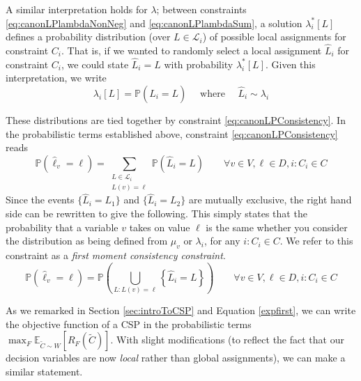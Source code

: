 A similar interpretation holds for $\lambda$; between constraints \ref{eq:canonLPlambdaNonNeg} and \ref{eq:canonLPlambdaSum}, a solution $\lambda^*_i[L]$ defines a probability distribution (over $L \in \mathcal{L}_i$) of possible local assignments for constraint $C_i$. That is, if we wanted to randomly select a local  assignment $\hat{L}_i$ for constraint $C_i$, we could state $\hat{L}_i = L$ with probability $\lambda^*_i[L]$. Given this interpretation, we write
\begin{equation}
\lambda_i[L] = \mathbb{P}\left( \hat{L}_i = L \right) \quad \text{ where } \quad \hat{L}_i \sim \lambda_i 
\end{equation}
  
These distributions are tied together by constraint \ref{eq:canonLPConsistency}. In the probabilistic terms established above, constraint \ref{eq:canonLPConsistency} reads
\begin{equation}
\mathbb{P}\left( \hat{\ell}_v = \ell \right) = \sum_{\substack{L \in \mathcal{L}_i \\ L(v) = \ell}} \mathbb{P}\left( \hat{L}_i = L \right) \qquad \forall v \in V, \ell \in D, i : C_i \in C
\end{equation}
Since the events  $\{\hat{L}_i = L_1 \}$ and $\{\hat{L}_i = L_2 \}$ are mutually exclusive, the right hand side can be rewritten to give the following. This simply states that the probability that a variable $v$ takes on value $\ell$ is the same whether you consider the distribution as being defined from $\mu_v$ or $\lambda_i$, for any $i : C_i \in C$. We refer to this constraint as a \textit{first moment consistency constraint}.
\begin{equation} 
\mathbb{P}\left( \hat{\ell}_v = \ell \right) = \mathbb{P}\left( \bigcup_{L : L(v) =  \ell} \left\{\hat{L}_i = L\right\} \right) \qquad \forall v \in V, \ell \in D, i : C_i \in C
\end{equation}

As we remarked in Section \ref{sec:introToCSP} and Equation \ref{expfirst}, we can write the objective function of a CSP in the probabilistic terms $\max_{F} \mathbb{E}_{\tilde{C} \sim W}\left[R_F(\tilde{C})\right] $. With slight modifications (to reflect the fact that our decision variables are now \textit{local} rather than global assignments), we can make a similar statement. 

